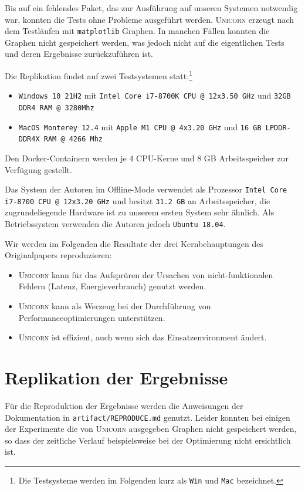 \documentclass[11pt]{article}
\begin{document}
Bis auf ein fehlendes Paket, das zur Ausführung auf unseren Systemen notwendig war, konnten die Tests ohne Probleme ausgeführt werden. \textsc{Unicorn} erzeugt nach dem Testläufen mit \texttt{matplotlib} Graphen. In manchen Fällen konnten die Graphen nicht gespeichert werden, was jedoch nicht auf die eigentlichen Tests und deren Ergebnisse zurückzuführen ist.

Die Replikation findet auf zwei Testsystemen statt:\footnote{Die Testsysteme werden im Folgenden kurz als \texttt{Win} und \texttt{Mac} bezeichnet.}
\begin{itemize}
  \itemsep0em
  \item \texttt{Windows 10 21H2} mit \texttt{Intel Core i7-8700K CPU @ 12x3.50 GHz} und \texttt{32GB DDR4 RAM @ 3280Mhz}
  \item \texttt{MacOS Monterey 12.4} mit \texttt{Apple M1 CPU @ 4x3.20 GHz} und \texttt{16 GB LPDDR-DDR4X RAM @ 4266 Mhz}
\end{itemize}
Den Docker-Containern werden je 4 CPU-Kerne und 8 GB Arbeitsspeicher zur Verfügung gestellt.

Das System der Autoren im Offline-Mode verwendet als Prozessor \texttt{Intel Core i7-8700 CPU @ 12x3.20 GHz} und besitzt \texttt{31.2 GB} an Arbeitsspeicher, die zugrundeliegende Hardware ist zu unserem ersten System sehr ähnlich. Als Betriebssystem verwenden die Autoren jedoch \texttt{Ubuntu 18.04}.

Wir werden im Folgenden die Resultate der drei Kernbehauptungen des Originalpapers reproduzieren:

\begin{itemize}
  \itemsep0em
  \item \textsc{Unicorn} kann für das Aufsprüren der Ursachen von nicht-funktionalen Fehlern (Latenz, Energieverbrauch) genutzt werden.
  \item \textsc{Unicorn} kann als Werzeug bei der Durchführung von Performanceoptimierungen unterstützen.
  \item \textsc{Unicorn} ist effizient, auch wenn sich das Einsatzenvironment ändert.
\end{itemize}

\section{Replikation der Ergebnisse}

Für die Reproduktion der Ergebnisse werden die Anweisungen der Dokumentation in \texttt{artifact/REPRODUCE.md} genutzt. Leider konnten bei einigen der Experimente die von \textsc{Unicorn} ausgegeben Graphen nicht gespeichert werden, so dass der zeitliche Verlauf beispielsweise bei der Optimierung nicht ersichtlich ist.
\end{document}
